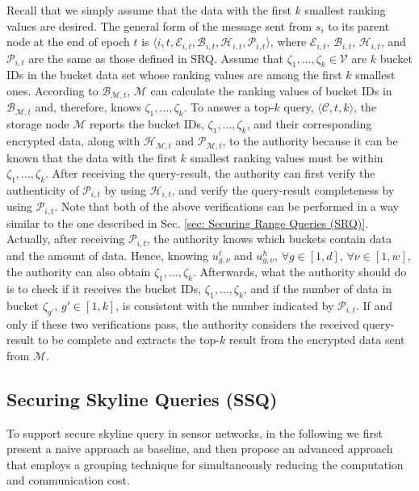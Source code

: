 \documentclass[conference]{IEEEtran}
\begin{document}
Recall that we simply assume that the data with the first $k$ smallest ranking values are desired. The general form of the message sent from $s_i$ to its parent node at the end of epoch $t$ is $\langle i,t,\mathcal{E}_{i,t},\mathcal{B}_{i,t},\mathcal{H}_{i,t},\mathcal{P}_{i,t}\rangle$, where $\mathcal{E}_{i,t}$, $\mathcal{B}_{i,t}$, $\mathcal{H}_{i,t}$, and $\mathcal{P}_{i,t}$ are the same as those defined in SRQ. Assume that $\zeta_1,\dots,\zeta_k\in \mathcal{V}$ are $k$ bucket IDs in the bucket data set whose ranking values are among the first $k$ smallest ones. According to $\mathcal{B}_{\mathcal{M},t}$, $\mathcal{M}$ can calculate the ranking values of bucket IDs in $\mathcal{B}_{\mathcal{M},t}$ and, therefore, knows $\zeta_1,\dots,\zeta_k$. To answer a top-$k$ query, $\langle \mathcal{C}, t, k\rangle$, the storage node $\mathcal{M}$ reports the bucket IDs, $\zeta_1,\dots,\zeta_k$, and their corresponding encrypted data, along with $\mathcal{H}_{\mathcal{M},t}$ and $\mathcal{P}_{\mathcal{M},t}$, to the authority because it can be known that the data with the first $k$ smallest ranking values must be within $\zeta_1,\dots,\zeta_k$. After receiving the query-result, the authority can first verify the authenticity of $\mathcal{P}_{i,t}$ by using $\mathcal{H}_{i,t}$, and verify the query-result completeness by using $\mathcal{P}_{i,t}$. Note that both of the above verifications can be performed in a way similar to the one described in Sec. \ref{sec: Securing Range Queries (SRQ)}. Actually, after receiving $\mathcal{P}_{i,t}$, the authority knows which buckets contain data and the amount of data. Hence, knowing $u_{g,\nu}^{\ell}$ and $u_{g,\nu}^h$, $\forall g\in[1,d]$, $\forall \nu\in[1,w]$, the authority can also obtain $\zeta_1,\dots,\zeta_k$. Afterwards, what the authority should do is to check if it receives the bucket IDs, $\zeta_1,\dots,\zeta_k$, and if the number of data in bucket $\zeta_{g'}$, $g'\in[1,k]$, is consistent with the number indicated by $\mathcal{P}_{i,t}$. If and only if these two verifications pass, the authority considers the received query-result to be complete and extracts the top-$k$ result from the encrypted data sent from $\mathcal{M}$.

\subsection{Securing Skyline Queries (SSQ)}\label{sec: Securing Skyline Queries (SSQ)}
To support secure skyline query in sensor networks, in the following we first present a naive approach as baseline, and then propose an advanced approach that employs a grouping technique for simultaneously reducing the computation and communication cost.
\end{document}

